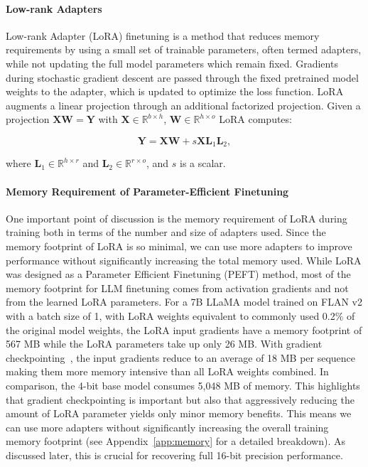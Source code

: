 \paragraph{Low-rank Adapters} Low-rank Adapter (LoRA) finetuning \citep{hu2021lora} is a method that reduces memory requirements by using a small set of trainable parameters, often termed adapters, while not updating the full model parameters which remain fixed. Gradients during stochastic gradient descent are passed through the fixed pretrained model weights to the adapter, which is updated to optimize the loss function. LoRA augments a linear projection through an additional factorized projection. Given a projection ${\mathbf{X} \mathbf{W} = \mathbf{Y}}$ with $\mathbf{X}\in  \mathbb{R}^{b\times h}$, $\mathbf{W}\in  \mathbb{R}^{h\times o}$ LoRA computes:

\begin{equation}
    \mathbf{Y} = \mathbf{X}\mathbf{W} + s\mathbf{X}\mathbf{L}_1\mathbf{L}_2,
\end{equation}

where $\mathbf{L}_1\in  \mathbb{R}^{h\times r}$ and $\mathbf{L}_2\in  \mathbb{R}^{r\times o}$, and $s$ is a scalar.

\paragraph{Memory Requirement of Parameter-Efficient Finetuning} One important point of discussion is the memory requirement of LoRA during training both in terms of the number and size of adapters used. Since the memory footprint of LoRA is so minimal, we can use more adapters to improve performance without significantly increasing the total memory used. While LoRA was designed as a Parameter Efficient Finetuning (PEFT) method, most of the memory footprint for LLM finetuning comes from activation gradients and not from the learned LoRA parameters. For a 7B LLaMA model trained on FLAN v2 with a batch size of 1, with LoRA weights equivalent to commonly used 0.2\% of the original model weights\citep{hu2021lora,liu2022few}, the LoRA input gradients have a memory footprint of 567 MB while the LoRA parameters take up only 26 MB. With gradient checkpointing~\citep{chen2016training}, the input gradients reduce to an average of 18 MB per sequence making them more memory intensive than all LoRA weights combined. In comparison, the 4-bit base model consumes 5,048 MB of memory. This highlights that gradient checkpointing is important but also that aggressively reducing the amount of LoRA parameter yields only minor memory benefits. This means we can use more adapters without significantly increasing the overall training memory footprint (see Appendix~\ref{app:memory} for a detailed breakdown). As discussed later, this is crucial for recovering full 16-bit precision performance.

